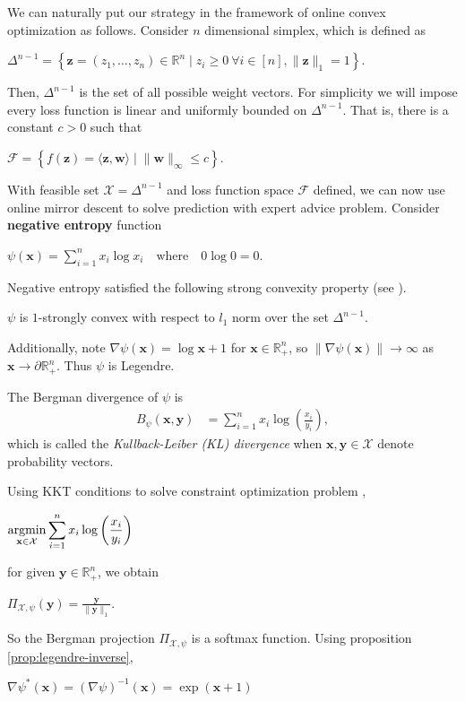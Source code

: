 \documentclass[12pt, a4paper]{report}
\begin{document}
We can naturally put our strategy in the framework of online convex optimization as follows. Consider $n$ dimensional simplex, which is defined as
\begin{center}
    $\Delta^{n-1} = \left\{\mathbf{z} = (z_1, \dots, z_n) \in \mathbb{R}^n \mid z_i \geq 0\ \forall i \in [n], \lVert \mathbf{z} \rVert_1 = 1 \right\}$.
\end{center}
Then, $\Delta^{n-1}$ is the set of all possible weight vectors. For simplicity we will impose every loss function is linear and uniformly bounded on $\Delta^{n-1}$. That is, there is a constant $c > 0$ such that
\begin{center}
    $\mathcal{F} = \left\{ f(\mathbf{z}) = \langle \mathbf{z}, \mathbf{w} \rangle \mid \lVert \mathbf{w} \rVert_\infty \leq c \right\}$.  
\end{center}

With feasible set $\mathcal{X} = \Delta^{n-1}$ and loss function space $\mathcal{F}$ defined, we can now use online mirror descent to solve prediction with expert advice problem. Consider \textbf{negative entropy} function
\begin{center}
    $\psi(\mathbf{x}) = \sum_{i=1}^n x_i \log x_i \quad \text{where} \quad 0\log0 = 0$.
\end{center}

Negative entropy satisfied the following strong convexity property (see \cite[lemma 16]{ShalevShwartz2007OnlineLT}).
\begin{lem}
$\psi$ is $1$-strongly convex with respect to $l_1$ norm over the set $\Delta^{n-1}$.
\end{lem}

Additionally, note $\nabla \psi(\mathbf{x}) = \log\mathbf{x} + 1$ for $\mathbf{x} \in \mathbb{R}_{+}^n$, so $\lVert \nabla \psi(\mathbf{x})\rVert \rightarrow \infty$ as $\mathbf{x} \rightarrow \partial \mathbb{R}_{+}^n$. Thus $\psi$ is Legendre.  

The Bergman divergence of $\psi$ is
\begin{align*}
    B_\psi(\mathbf{x}, \mathbf{y}) &= \sum_{i=1}^n x_i \log \left(\frac{x_i}{y_i}\right),
\end{align*}
which is called the \textit{Kullback-Leiber (KL) divergence} when $\mathbf{x}, \mathbf{y} \in \mathcal{X}$ denote probability vectors. 

Using KKT conditions to solve constraint optimization problem \cite{Boyd2004ConvexO}, 
\begin{center}
    $\displaystyle \operatorname*{argmin}_{\mathbf{x} \in \mathcal{X}} \sum_{i=1}^n x_i \log\left(\frac{x_i}{y_i}\right)$
\end{center}
for given $\mathbf{y} \in \mathbb{R}_{+}^n$, we obtain
\begin{center}
    $\displaystyle \Pi_{\mathcal{X}, \psi}(\mathbf{y}) = \frac{\mathbf{y}}{\lVert \mathbf{y} \rVert_1}$.
\end{center}
So the Bergman projection $\Pi_{\mathcal{X}, \psi}$ is a softmax function. Using proposition \ref{prop:legendre-inverse},
\begin{center}
    $\nabla \psi^*(\mathbf{x}) = (\nabla \psi)^{-1}(\mathbf{x}) = \exp(\mathbf{x} + 1)$
\end{center}
\end{document}
